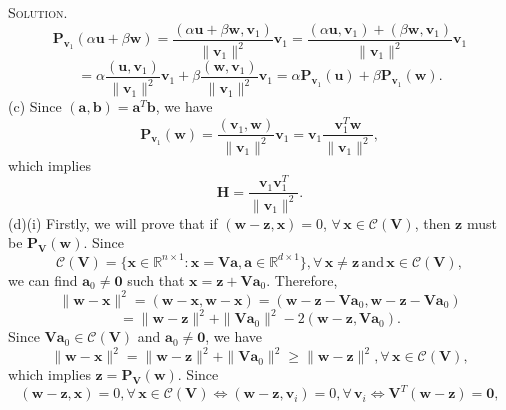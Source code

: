 \documentclass[12pt, a4paper, oneside]{ctexart}
\newenvironment{solution}{\par\noindent\textsc{Solution. }}{\\\par}
\newcommand{\proj}[2]{\textbf{P}_{#2} (#1)}
\begin{document}
\begin{solution}
    \[
    \proj{\alpha \mathbf{u} + \beta \mathbf{w}}{\mathbf{v}_1} = \frac{(\alpha \mathbf{u} + \beta \mathbf{w}, \mathbf{v}_1)}{\|\mathbf{v}_1\|^2} \mathbf{v}_1
    = \frac{(\alpha \mathbf{u}, \mathbf{v}_1) + (\beta \mathbf{w}, \mathbf{v}_1)}{\|\mathbf{v}_1\|^2} \mathbf{v}_1
    \]
    \[
    = \alpha \frac{(\mathbf{u}, \mathbf{v}_1)}{\|\mathbf{v}_1\|^2} \mathbf{v}_1 + \beta \frac{(\mathbf{w}, \mathbf{v}_1)}{\|\mathbf{v}_1\|^2} \mathbf{v}_1
    = \alpha \proj{\mathbf{u}}{\mathbf{v}_1} + \beta \proj{\mathbf{w}}{\mathbf{v}_1}.
    \]
    \newline\newline
    (c) Since $(\mathbf{a}, \mathbf{b}) = \mathbf{a}^T \mathbf{b}$, we have
    \[
    \proj{\mathbf{w}}{\mathbf{v}_1} = \frac{(\mathbf{v}_1, \mathbf{w})}{\|\mathbf{v}_1\|^2} \mathbf{v}_1 = \mathbf{v}_1 \frac{\mathbf{v}_1^T \mathbf{w}}{\|\mathbf{v}_1\|^2},
    \]
    which implies
    \[
    \mathbf{H} = \frac{\mathbf{v}_1 \mathbf{v}_1^T}{\|\mathbf{v}_1\|^2}.
    \]
    \newline\newline
    (d)(i) Firstly, we will prove that if $(\mathbf{w} - \mathbf{z}, \mathbf{x}) = 0$, $\forall\, \mathbf{x} \in \mathcal{C}(\mathbf{V})$, then $\mathbf{z}$ must be $\proj{\mathbf{w}}{\mathbf{V}}$. Since 
    \[
    \mathcal{C}(\mathbf{V}) = \{\mathbf{x} \in \mathbb{R}^{n \times 1}: \mathbf{x} = \mathbf{V} \mathbf{a}, \mathbf{a} \in \mathbb{R}^{d \times 1}\}, \forall\, \mathbf{x} \neq \mathbf{z}\, \text{and}\, \mathbf{x} \in \mathcal{C}(\mathbf{V}),
    \]
    we can find $\mathbf{a}_0 \neq \mathbf{0}$ such that $\mathbf{x} = \mathbf{z} + \mathbf{V} \mathbf{a}_0$. Therefore,
    \[
    \|\mathbf{w} - \mathbf{x}\|^2 = (\mathbf{w} - \mathbf{x}, \mathbf{w} - \mathbf{x}) = (\mathbf{w} - \mathbf{z} - \mathbf{V} \mathbf{a}_0, \mathbf{w} - \mathbf{z} - \mathbf{V} \mathbf{a}_0) 
    \]
    \[
    = \|\mathbf{w} - \mathbf{z}\|^2 + \|\mathbf{V} \mathbf{a}_0\|^2 - 2 (\mathbf{w} - \mathbf{z}, \mathbf{V} \mathbf{a}_0).
    \]
    Since $\mathbf{V} \mathbf{a}_0 \in \mathcal{C}(\mathbf{V})$ and  $\mathbf{a}_0 \neq \mathbf{0}$, 
    we have 
    \[
    \|\mathbf{w} - \mathbf{x}\|^2 = \|\mathbf{w} - \mathbf{z}\|^2 + \|\mathbf{V} \mathbf{a}_0\|^2 \geq \|\mathbf{w} - \mathbf{z}\|^2, \forall\, \mathbf{x} \in \mathcal{C}(\mathbf{V}),
    \]
    which implies $\mathbf{z} = \proj{\mathbf{w}}{\mathbf{V}}$. 
    Since 
    \[
    (\mathbf{w} - \mathbf{z}, \mathbf{x}) = 0, \forall\, \mathbf{x} \in \mathcal{C}(\mathbf{V}) \Leftrightarrow (\mathbf{w} - \mathbf{z}, \mathbf{v}_i) = 0, \forall\, \mathbf{v}_i \Leftrightarrow \mathbf{V}^T (\mathbf{w} - \mathbf{z}) = \mathbf{0},
\]
\end{solution}
\end{document}
